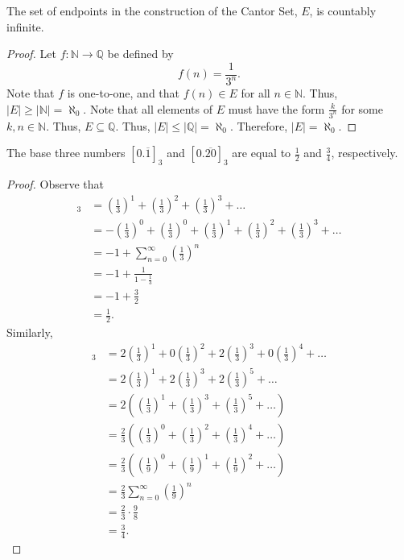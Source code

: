 \documentclass[12pt]{article}
\begin{document}
\newpage
{} The set of endpoints in the construction of the Cantor Set, $E$, is countably infinite.
\begin{proof}
    Let $f: \mathbb N \to \mathbb Q$ be defined by $$f(n) = \frac{1}{3^n}.$$ Note that $f$ is one-to-one, and that $f(n) \in E$ for all $n \in \mathbb N$. Thus, $|E| \geq |\mathbb N| = \aleph_0$. Note that all elements of $E$ must have the form $\frac k{3^n}$ for some $k,n \in \mathbb N$. Thus, $E \subseteq \mathbb Q$. Thus, $|E| \leq |\mathbb Q| = \aleph_0$. Therefore, $|E| = \aleph_0$.
\end{proof}

\newpage
{} The base three numbers $[0.\overline{1}]_3$ and $[0.\overline{20}]_3$ are equal to $\frac12$ and $\frac34$, respectively.
\begin{proof}
    Observe that
    \begin{align*}
        [0.\overline{1}]_3 &= \left(\frac13\right)^1 + \left(\frac13\right)^2 + \left(\frac13\right)^3 + \hdots \\
                           &= -\left(\frac13\right)^0 + \left(\frac13\right)^0 + \left(\frac13\right)^1 + \left(\frac13\right)^2 + \left(\frac13\right)^3 + \hdots \\
                           &= -1 + \sum_{n=0}^\infty \left(\frac13\right)^n \\
                           &= -1 + \frac1{1-\frac13} \\
                           &= -1 + \frac32 \\
                           &= \frac12.
    \end{align*}
    Similarly,
    \begin{align*}
        [0.\overline{20}]_3 &= 2\left(\frac13\right)^1 + 0\left(\frac13\right)^2 + 2\left(\frac13\right)^3 + 0\left(\frac13\right)^4 + \hdots \\
                            &= 2\left(\frac13\right)^1 + 2\left(\frac13\right)^3 + 2\left(\frac13\right)^5 + \hdots \\
                            &= 2\left(\left(\frac13\right)^1 + \left(\frac13\right)^3 + \left(\frac13\right)^5 + \hdots \right) \\
                            &= \frac23\left(\left(\frac13\right)^0 + \left(\frac13\right)^2 + \left(\frac13\right)^4 + \hdots \right) \\
                            &= \frac23\left(\left(\frac19\right)^0 + \left(\frac19\right)^1 + \left(\frac19\right)^2 + \hdots \right) \\
                            &= \frac23\sum_{n=0}^\infty \left(\frac19\right)^n \\
                            &= \frac23 \cdot \frac98 \\
                            &= \frac34.
    \end{align*}
\end{proof}
\end{document}
